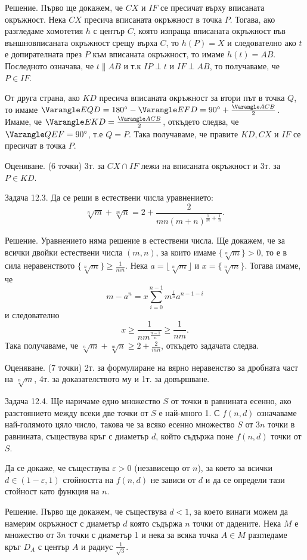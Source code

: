 Решение. Първо ще докажем, че $CX$ и $IF$ се пресичат върху вписаната окръжност. Нека $CX$ пресича вписаната окръжност в точка $P$. Тогава, ако разгледаме хомотетия $h$ с център $C$, която изпраща вписаната окръжност във външновписаната окръжност срещу върха $C$, то $h(P)=X$ и следователно ако $t$ е допирателната през $P$ към вписаната окръжност, то имаме $h(t)=AB$. Последното означава, че $t\parallel AB$ и т.к $IP\perp t$ и $IF\perp AB$, то получаваме, че $P\in IF$.

От друга страна, ако $KD$ пресича вписаната окръжност за втори път в точка $Q$, то имаме $\Varangle EQD=180^\circ-\Varangle EFD=90^\circ+\frac{\Varangle ACB}{2}$. Имаме, че $\Varangle EKD=\frac{\Varangle ACB}{2}$, откъдето следва, че $\Varangle QEF=90^\circ$, т.е $Q=P$. Така получаваме, че правите $KD,CX$ и $IF$ се пресичат в точка $P$.

Оценяване. (6 точки) 3т. за $CX\cap IF$ лежи на вписаната окръжност и 3т. за $P\in KD$.

Задача 12.3. Да се реши в естествени числа уравнението:
$$
\sqrt[n]{m}+\sqrt[m]{n}=2+\frac{2}{mn(m+n)^{\frac1m+\frac1n}}.
$$

Решение. Уравнението няма решение в естествени числа. Ще докажем, че за всички двойки естествени числа $(m,n)$, за които имаме $\{\sqrt[n]{m}\}>0$, то е в сила неравенството $\{\sqrt[n]{m}\}\geq\frac1{mn}$. Нека $a=\lfloor\sqrt[n]{m}\rfloor$ и $x=\{\sqrt[n]{m}\}$. Тогава имаме, че
$$
m-a^n=x\sum_{i=0}^{n-1}m^{\frac in}a^{n-1-i}
$$
и следователно
$$
x\geq\frac1{nm^{\frac{n-1}{n}}}\geq\frac1{nm}.
$$
Така получаваме, че $\sqrt[n]{m}+\sqrt[m]{n}\geq2+\frac2{mn}$, откъдето задачата следва.

Оценяване. (7 точки) 2т. за формулиране на вярно неравенство за дробната част на $\sqrt[n]{m}$, 4т. за доказателството му и 1т. за довършване.

Задача 12.4. Ще наричаме едно множество $S$ от точки в равнината есенно, ако разстоянието между всеки две точки от $S$ е най-много 1. С $f(n,d)$ означаваме най-голямото цяло число, такова че за всяко есенно множество $S$ от $3n$ точки в равнината, съществува кръг с диаметър $d$, който съдържа поне $f(n,d)$ точки от $S$.

Да се докаже, че съществува $\varepsilon>0$ (независещо от $n$), за което за всички $d\in(1-\varepsilon,1)$ стойността на $f(n,d)$ не зависи от $d$ и да се определи тази стойност като функция на $n$.

Решение. Първо ще докажем, че съществува $d<1$, за което винаги можем да намерим окръжност с диаметър $d$ която съдържа $n$ точки от дадените. Нека $M$ е множество от $3n$ точки с диаметър 1 и нека за всяка точка $A\in M$ разгледаме кръг $D_A$ с център $A$ и радиус $\frac1{\sqrt3}$.

